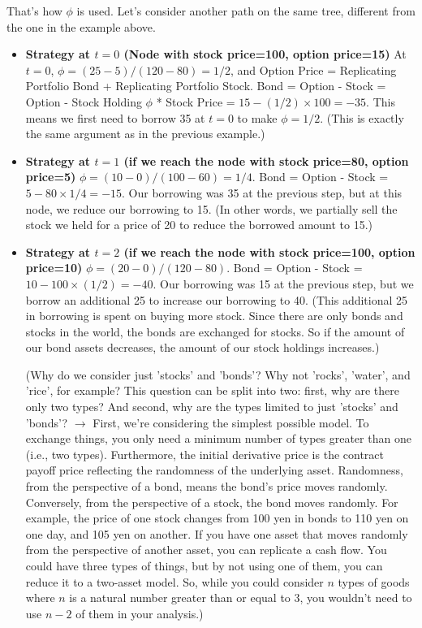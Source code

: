 \documentclass[uplatex,a4j,12pt,dvipdfmx]{jsarticle}
\begin{document}
That's how $\phi$ is used. Let's consider another path on the same tree, different from the one in the example above.

\begin{itemize}
	\item \textbf{Strategy at $t=0$ (Node with stock price=100, option price=15)}
	      At $t=0$, $\phi = (25-5)/(120-80)=1/2$, and Option Price = Replicating Portfolio Bond + Replicating Portfolio Stock. Bond = Option - Stock = Option - Stock Holding $\phi$ * Stock Price = $15 - (1/2) \times 100 = -35$. This means we first need to borrow 35 at $t=0$ to make $\phi=1/2$. (This is exactly the same argument as in the previous example.)

	\item \textbf{Strategy at $t=1$ (if we reach the node with stock price=80, option price=5)}
	      $\phi = (10-0)/(100-60)=1/4$. Bond = Option - Stock = $5-80 \times 1/4 = -15$. Our borrowing was 35 at the previous step, but at this node, we reduce our borrowing to 15. (In other words, we partially sell the stock we held for a price of 20 to reduce the borrowed amount to 15.)

	\item \textbf{Strategy at $t=2$ (if we reach the node with stock price=100, option price=10)}
	      $\phi = (20-0)/(120-80)$. Bond = Option - Stock = $10-100 \times (1/2) = -40$. Our borrowing was 15 at the previous step, but we borrow an additional 25 to increase our borrowing to 40. (This additional 25 in borrowing is spent on buying more stock. Since there are only bonds and stocks in the world, the bonds are exchanged for stocks. So if the amount of our bond assets decreases, the amount of our stock holdings increases.)

	      (Why do we consider just 'stocks' and 'bonds'? Why not 'rocks', 'water', and 'rice', for example? This question can be split into two: first, why are there only two types? And second, why are the types limited to just 'stocks' and 'bonds'? $\to$ First, we're considering the simplest possible model. To exchange things, you only need a minimum number of types greater than one (i.e., two types). Furthermore, the initial derivative price is the contract payoff price reflecting the randomness of the underlying asset. Randomness, from the perspective of a bond, means the bond's price moves randomly. Conversely, from the perspective of a stock, the bond moves randomly. For example, the price of one stock changes from 100 yen in bonds to 110 yen on one day, and 105 yen on another. If you have one asset that moves randomly from the perspective of another asset, you can replicate a cash flow. You could have three types of things, but by not using one of them, you can reduce it to a two-asset model. So, while you could consider $n$ types of goods where $n$ is a natural number greater than or equal to 3, you wouldn't need to use $n-2$ of them in your analysis.)


\end{itemize}
\end{document}
